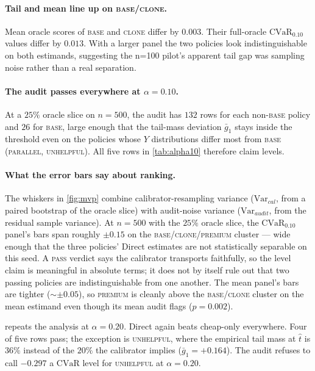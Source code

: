 \documentclass[11pt]{article}
\newcommand{\that}{\widehat{t}}
\newcommand{\CVaR}{\mathrm{CVaR}}
\begin{document}
\paragraph{Tail and mean line up on \textsc{base}/\textsc{clone}.}
Mean oracle scores of \textsc{base} and \textsc{clone} differ by
$0.003$. Their full-oracle $\CVaR_{0.10}$ values differ by $0.013$.
With a larger panel the two policies look indistinguishable on both
estimands, suggesting the n=100 pilot's apparent tail gap was
sampling noise rather than a real separation.

\paragraph{The audit passes everywhere at $\alpha = 0.10$.}
At a $25\%$ oracle slice on $n = 500$, the audit has $132$ rows for
each non-\textsc{base} policy and $26$ for \textsc{base}, large enough
that the tail-mass deviation $\bar g_1$ stays inside the threshold
even on the policies whose $Y$ distributions differ most from
\textsc{base} (\textsc{parallel}, \textsc{unhelpful}). All five rows
in \cref{tab:alpha10} therefore claim levels.

\paragraph{What the error bars say about ranking.}
The whiskers in \cref{fig:mvp} combine calibrator-resampling variance
($\mathrm{Var}_{cal}$, from a paired bootstrap of the oracle slice)
with audit-noise variance ($\mathrm{Var}_{audit}$, from the residual
sample variance). At $n = 500$ with the $25\%$ oracle slice, the
$\CVaR_{0.10}$ panel's bars span roughly $\pm 0.15$ on the
\textsc{base}/\textsc{clone}/\textsc{premium} cluster — wide enough
that the three policies' Direct estimates are not statistically
separable on this seed. A \textsc{pass} verdict says the calibrator
transports faithfully, so the level claim is meaningful in absolute
terms; it does not by itself rule out that two passing policies are
indistinguishable from one another. The mean panel's bars are tighter
($\sim \pm 0.05$), so \textsc{premium} is cleanly above the
\textsc{base}/\textsc{clone} cluster on the mean estimand even though
its mean audit flags ($p = 0.002$).

 repeats the analysis at $\alpha = 0.20$. Direct
again beats cheap-only everywhere. Four of five rows pass; the
exception is \textsc{unhelpful}, where the empirical tail mass at
$\that$ is $36\%$ instead of the $20\%$ the calibrator implies
($\bar g_1 = +0.164$). The audit refuses to call $-0.297$ a $\CVaR$
level for \textsc{unhelpful} at $\alpha = 0.20$.
\end{document}
